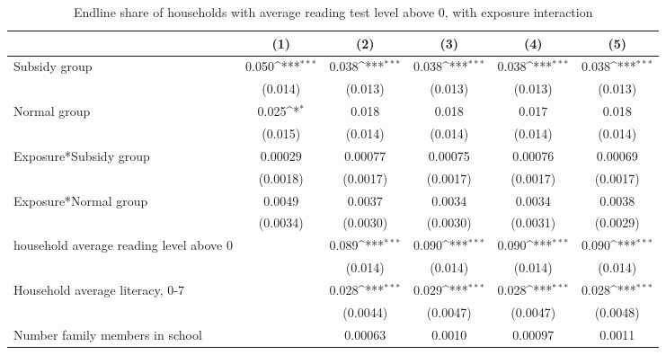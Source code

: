\begin{table}[htbp]\centering
\def\sym#1{\ifmmode^{#1}\else\(^{#1}\)\fi}
\caption{Endline share of households with average reading test level above 0, with exposure interaction}
\begin{tabular*}{1\hsize}{@{\hskip\tabcolsep\extracolsep\fill}l*{5}{c}}
\toprule
                &\multicolumn{1}{c}{(1)}         &\multicolumn{1}{c}{(2)}         &\multicolumn{1}{c}{(3)}         &\multicolumn{1}{c}{(4)}         &\multicolumn{1}{c}{(5)}         \\
\midrule
Subsidy group   &    0.050\sym{***}&    0.038\sym{***}&    0.038\sym{***}&    0.038\sym{***}&    0.038\sym{***}\\
                &  (0.014)         &  (0.013)         &  (0.013)         &  (0.013)         &  (0.013)         \\
Normal group    &    0.025\sym{*}  &    0.018         &    0.018         &    0.017         &    0.018         \\
                &  (0.015)         &  (0.014)         &  (0.014)         &  (0.014)         &  (0.014)         \\
Exposure*Subsidy group&  0.00029         &  0.00077         &  0.00075         &  0.00076         &  0.00069         \\
                & (0.0018)         & (0.0017)         & (0.0017)         & (0.0017)         & (0.0017)         \\
Exposure*Normal group&   0.0049         &   0.0037         &   0.0034         &   0.0034         &   0.0038         \\
                & (0.0034)         & (0.0030)         & (0.0030)         & (0.0031)         & (0.0029)         \\
household average reading level above 0&                  &    0.089\sym{***}&    0.090\sym{***}&    0.090\sym{***}&    0.090\sym{***}\\
                &                  &  (0.014)         &  (0.014)         &  (0.014)         &  (0.014)         \\
Household average literacy, 0-7&                  &    0.028\sym{***}&    0.029\sym{***}&    0.028\sym{***}&    0.028\sym{***}\\
                &                  & (0.0044)         & (0.0047)         & (0.0047)         & (0.0048)         \\
Number family members in school&                  &  0.00063         &   0.0010         &  0.00097         &   0.0011         \\

\end{tabular*}
\end{table}
